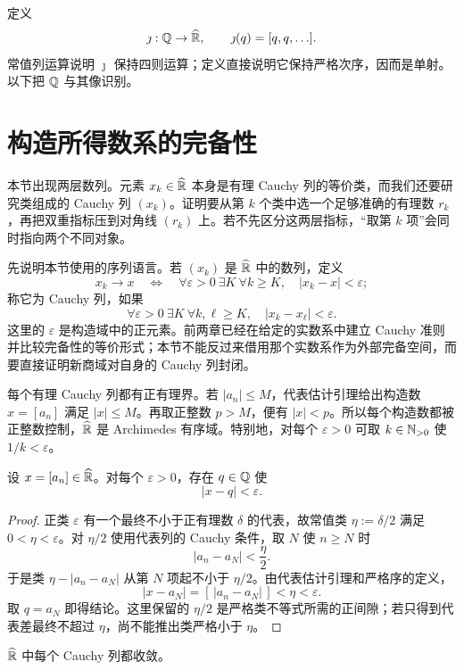 定义
\[
 \jmath:\mathbb{Q}\to\widehat{\mathbb{R}},\qquad
 \jmath(q)=[q,q,\ldots].
\]
常值列运算说明 \(\jmath\) 保持四则运算；定义直接说明它保持严格次序，因而是单射。以下把 \(\mathbb{Q}\) 与其像识别。

\section{构造所得数系的完备性}

本节出现两层数列。元素 \(x_k\in\widehat{\mathbb{R}}\) 本身是有理 Cauchy 列的等价类，而我们还要研究类组成的 Cauchy 列 \((x_k)\)。证明要从第 \(k\) 个类中选一个足够准确的有理数 \(r_k\)，再把双重指标压到对角线 \((r_k)\) 上。若不先区分这两层指标，“取第 \(k\) 项”会同时指向两个不同对象。


先说明本节使用的序列语言。若 \((x_k)\) 是 \(\widehat{\mathbb{R}}\) 中的数列，定义
\[
 x_k\longrightarrow x
 \quad\Longleftrightarrow\quad
 \forall\varepsilon>0\ \exists K\ \forall k\ge K,
 \quad |x_k-x|<\varepsilon;
\]
称它为 Cauchy 列，如果
\[
 \forall\varepsilon>0\ \exists K\ \forall k,\ell\ge K,
 \quad |x_k-x_\ell|<\varepsilon.
\]
这里的 \(\varepsilon\) 是构造域中的正元素。前两章已经在给定的实数系中建立 Cauchy 准则并比较完备性的等价形式；本节不能反过来借用那个实数系作为外部完备空间，而要直接证明新商域对自身的 Cauchy 列封闭。

每个有理 Cauchy 列都有正有理界。若 \(|a_n|\le M\)，代表估计引理给出构造数
\(x=[a_n]\) 满足 \(|x|\le M\)。再取正整数 \(p>M\)，便有
\(|x|<p\)。所以每个构造数都被正整数控制，\(\widehat{\mathbb{R}}\) 是 Archimedes 有序域。特别地，对每个 \(\varepsilon>0\) 可取 \(k\in\mathbb{N}_{>0}\) 使 \(1/k<\varepsilon\)。

\begin{proposition}[由代表列作有理近似]
设 \(x=[a_n]\in\widehat{\mathbb{R}}\)。对每个 \(\varepsilon>0\)，存在 \(q\in\mathbb{Q}\) 使
\[
 |x-q|<\varepsilon.
\]
\end{proposition}

\begin{proof}
正类 \(\varepsilon\) 有一个最终不小于正有理数 \(\delta\) 的代表，故常值类 \(\eta:=\delta/2\) 满足 \(0<\eta<\varepsilon\)。对 \(\eta/2\) 使用代表列的 Cauchy 条件，取 \(N\) 使 \(n\ge N\) 时
\[
 |a_n-a_N|<\frac{\eta}{2}.
\]
于是类 \(\eta-|a_n-a_N|\) 从第 \(N\) 项起不小于 \(\eta/2\)。由代表估计引理和严格序的定义，
\[
 |x-a_N|=[\,|a_n-a_N|\,]<\eta<\varepsilon.
\]
取 \(q=a_N\) 即得结论。这里保留的 \(\eta/2\) 是严格类不等式所需的正间隙；若只得到代表差最终不超过 \(\eta\)，尚不能推出类严格小于 \(\eta\)。
\end{proof}

\begin{theorem}
\(\widehat{\mathbb{R}}\) 中每个 Cauchy 列都收敛。
\end{theorem}

